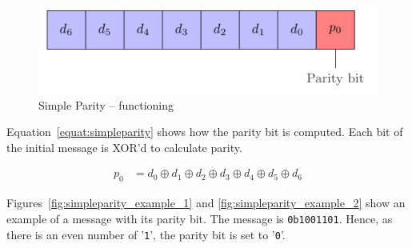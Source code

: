\begin{figure}[ht]
    \centering
    \includegraphics[page=1]{c5_countermeasures_dift/img/simple_parity.pdf}
    \caption{Simple Parity -- functioning}
    \label{fig:simpleparity_functionning}
\end{figure}

Equation~\ref{equat:simpleparity} shows how the parity bit is computed. Each bit of the initial message is XOR'd to calculate parity.

\begin{equation} \label{equat:simpleparity}
    \begin{split}
        p_{0} &= d_{0} \oplus d_{1} \oplus d_{2} \oplus d_{3} \oplus d_{4} \oplus d_{5} \oplus d_{6}
    \end{split}
\end{equation}


Figures~\ref{fig:simpleparity_example_1} and \ref{fig:simpleparity_example_2} show an example of a message with its parity bit. The message is \texttt{0b1001101}. Hence, as there is an even number of '\texttt{1}', the parity bit is set to '\texttt{0}'.

